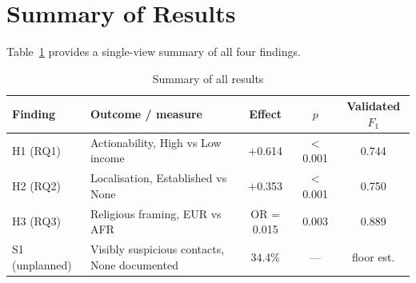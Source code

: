 \section{Summary of Results}

Table~\ref{tab:results_summary} provides a single-view summary of all four findings.

\begin{table}[H]
\centering
\caption{Summary of all results}
\label{tab:results_summary}
\begin{tabular}{llccc}
\toprule
Finding & Outcome / measure & Effect & $p$ & Validated $F_1$ \\
\midrule
H1 (RQ1) & Actionability, High vs Low income & $+$0.614 & $<$0.001 & 0.744 \\
H2 (RQ2) & Localisation, Established vs None & $+$0.353 & $<$0.001 & 0.750 \\
H3 (RQ3) & Religious framing, EUR vs AFR & OR = 0.015 & 0.003 & 0.889 \\
S1 (unplanned) & Visibly suspicious contacts, None documented & 34.4\% & --- & floor est. \\
\bottomrule
\end{tabular}
\end{table}
